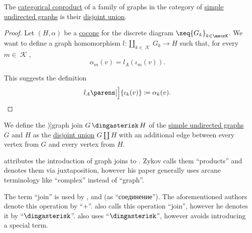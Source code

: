\begin{proposition}\label{thm:undirected_graph_coproduct}
  The \hyperref[def:discrete_category_limits]{categorical coproduct} of a family of graphs in the category of \hyperref[def:undirected_graph]{simple undirected graphs} is their \hyperref[def:graph_disjoint_union]{disjoint union}.
\end{proposition}
\begin{proof}
  Let \( (H, \alpha) \) be a \hyperref[def:category_of_cones/cocone]{cocone} for the discrete diagram \( \seq{ G_k }_{k \in \mscrK} \). We want to define a graph homomorphism \( l: \coprod_{k \in \mscrK} G_k \to H \) such that, for every \( m \in \mscrK \),
  \begin{equation*}
    \alpha_m(v) = l_A(\iota_m(v)).
  \end{equation*}

  This suggests the definition
  \begin{equation*}
    l_A\parens[\Big]{ \iota_k(v) } \coloneqq \alpha_k(v).
  \end{equation*}
\end{proof}

\begin{definition}\label{def:graph_join}
  We define the \term[ru=соединение (графов) (\cite[265]{Новиков2013})]{graph join} \( G \Ast H \) of the \hyperref[def:undirected_graph]{simple undirected graphs} \( G \) and \( H \) as the \hyperref[def:graph_disjoint_union]{disjoint union} \( G \coprod H \) with an additional edge between every vertex from \( G \) and every vertex from \( H \).
\end{definition}
\begin{comments}
  \item {} attributes the introduction of graph joins to \cite[164]{Зыков1949}. Zykov calls them \enquote{products} and denotes them via juxtaposition, however his paper generally uses arcane terminology like \enquote{complex} instead of \enquote{graph}.

  The term \enquote{join} is used by ,  and  (as \enquote{соединение}). The aforementioned authors denote this operation by \enquote{\( + \)}.  also calls this operation \enquote{join}, however he denotes it by \enquote{\( \Ast \)}.  also uses \enquote{\( \Ast \)}, however avoids introducing a special term.
\end{comments}

